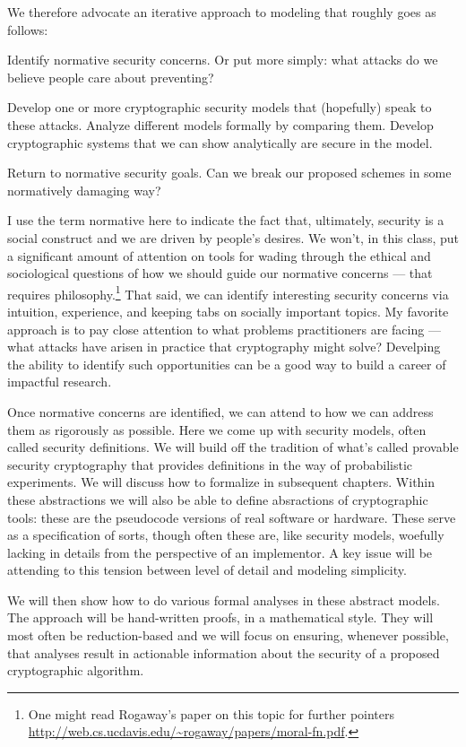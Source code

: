 We therefore advocate an iterative approach to modeling that
roughly goes as follows:
\begin{newenum}
\item Identify normative security concerns. Or put more simply: what attacks do we believe
people care about preventing?  
%
\item Develop one or more cryptographic security models that (hopefully) speak to these
attacks. Analyze different models formally by comparing them. Develop cryptographic
systems that we can show analytically are secure in the model.
%
\item Return to normative security goals. Can we break our proposed schemes
in some normatively damaging way?  
\end{newenum} 
I use the term normative here to indicate the fact that, ultimately, security
is a social construct and we are driven by people's desires. We won't, in this
class, put a significant amount of attention on tools for wading through the ethical and
sociological questions of how we should guide our normative concerns --- that
requires philosophy.\footnote{One might read Rogaway's paper on this topic for
further pointers
\url{http://web.cs.ucdavis.edu/~rogaway/papers/moral-fn.pdf}.}  
That said, we can identify interesting security concerns via intuition,
experience, and keeping tabs on socially important topics. My favorite approach
is to pay close attention to what problems practitioners are facing --- what attacks have
arisen in practice that cryptography might solve? Develping the ability to
identify such opportunities can be a good way to build a career of impactful
research. 

Once normative concerns are identified, we can attend to how we can address them
as rigorously as possible. Here we come up with security models, often called
security definitions. We will build off the tradition of
what's called provable security cryptography that provides definitions in the way of
probabilistic experiments. We will discuss how to formalize in subsequent
chapters. Within these abstractions we will also be able to define absractions
of cryptographic tools: these are the pseudocode versions of real software or
hardware. These serve as a specification of sorts, though often these are, like
security models, woefully lacking in details from the perspective of an
implementor. A key issue will be attending to this tension between level of
detail and modeling simplicity. 

We will then show how to do various formal analyses in these abstract models.
The approach will be hand-written proofs, in a mathematical style. They will
most often be reduction-based and we will focus on ensuring, whenever possible,
that  analyses result in actionable information about the security of a proposed
cryptographic algorithm. 

